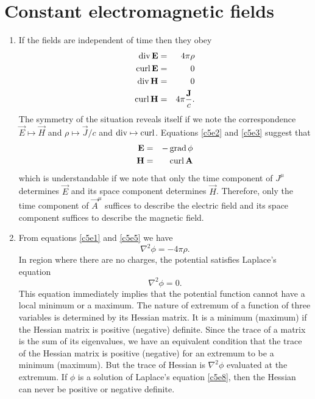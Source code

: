 \chapter{Constant electromagnetic fields}\label{c5}
\begin{enumerate}
\item If the fields are independent of time then they obey
\begin{eqnarray}
\operatorname{div}\mathbf{E} &=& 4\pi\rho \label{c5e1} \\
\operatorname{curl}\mathbf{E} &=& 0 \label{c5e2} \\
\operatorname{div}\mathbf{H} &=& 0 \label{c5e3} \\
\operatorname{curl}\mathbf{H} &=& 4\pi\frac{\mathbf{J}}{c}. \label{c5e4}
\end{eqnarray}
The symmetry of the situation reveals itself if we note the correspondence $\vec{E}
\mapsto \vec{H}$ and $\rho \mapsto \vec{J}/c$ and $\operatorname{div} \mapsto \operatorname{curl}$. Equations
\eqref{c5e2} and \eqref{c5e3} suggest that
\begin{eqnarray}
\mathbf{E} &=& -\operatorname{grad}\phi \label{c5e5} \\
\mathbf{H} &=& \operatorname{curl}\mathbf{A} \label{c5e6}
\end{eqnarray}
which is understandable if we note that only the time component of $J^\mu$ 
determines $\vec{E}$ and its space component determines $\vec{H}$. Therefore,
only the time component of $\vec{A}^\mu$ suffices to describe the electric
field and its space component suffices to describe the magnetic field.

\item From equations \eqref{c5e1} and \eqref{c5e5} we have
\begin{equation}\label{c5e7}
\nabla^2\phi = -4\pi\rho.
\end{equation}
In region where there are no charges, the potential satisfies Laplace's equation
\begin{equation}\label{c5e8}
\nabla^2\phi = 0.
\end{equation}
This equation immediately implies that the potential function cannot have a local
minimum or a maximum. The nature of extremum of a function of three variables is
determined by its Hessian matrix. It is a minimum (maximum) if the Hessian matrix
is positive (negative) definite. Since the trace of a matrix is the sum of its
eigenvalues, we have an equivalent condition that the trace of the Hessian matrix
is positive (negative) for an extremum to be a minimum (maximum). But the trace
of Hessian is $\nabla^2\phi$ evaluated at the extremum. If $\phi$ is a solution
of Laplace's equation \eqref{c5e8}, then the Hessian can never be positive or
negative definite.


\end{enumerate}
